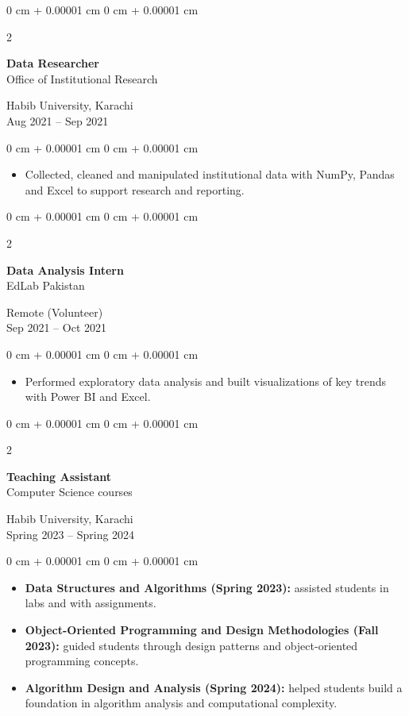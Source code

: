 \documentclass[10pt, letterpaper]{article}
\newenvironment{highlights}{
    \begin{itemize}[
        topsep=0.10 cm,
        parsep=0.10 cm,
        partopsep=0pt,
        itemsep=0pt,
        leftmargin=0 cm + 10pt
    ]
}{
    \end{itemize}
} %
\newenvironment{onecolentry}{
    \begin{adjustwidth}{
        0 cm + 0.00001 cm
    }{
        0 cm + 0.00001 cm
    }
}{
    \end{adjustwidth}
} %
\newenvironment{twocolentry}[2][]{
    \onecolentry
    \def\secondColumn{#2}
    \setcolumnwidth{\fill, 4.5 cm}
    \begin{paracol}{2}
}{
    \switchcolumn \raggedleft \secondColumn
    \end{paracol}
    \endonecolentry
} %
\begin{document}
\vspace{0.2 cm}

\begin{twocolentry}{Habib University, Karachi \\ Aug 2021 -- Sep 2021}
    \textbf{Data Researcher} \\
    Office of Institutional Research
\end{twocolentry}
\begin{onecolentry}
    \begin{highlights}
        \item Collected, cleaned and manipulated institutional data with NumPy, Pandas and Excel to support research and reporting.
    \end{highlights}
\end{onecolentry}

\vspace{0.2 cm}

\begin{twocolentry}{Remote (Volunteer) \\ Sep 2021 -- Oct 2021}
    \textbf{Data Analysis Intern} \\
    EdLab Pakistan
\end{twocolentry}
\begin{onecolentry}
    \begin{highlights}
        \item Performed exploratory data analysis and built visualizations of key trends with Power BI and Excel.
    \end{highlights}
\end{onecolentry}

\vspace{0.2 cm}

\begin{twocolentry}{Habib University, Karachi \\ Spring 2023 -- Spring 2024}
    \textbf{Teaching Assistant} \\
    Computer Science courses
\end{twocolentry}
\begin{onecolentry}
    \begin{highlights}
        \item \textbf{Data Structures and Algorithms (Spring 2023):} assisted students in labs and with assignments.
        \item \textbf{Object-Oriented Programming and Design Methodologies (Fall 2023):} guided students through design patterns and object-oriented programming concepts.
        \item \textbf{Algorithm Design and Analysis (Spring 2024):} helped students build a foundation in algorithm analysis and computational complexity.
    \end{highlights}
\end{onecolentry}
\end{document}
